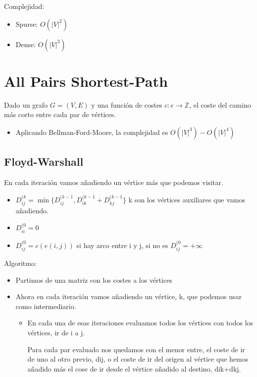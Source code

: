 \documentclass[12pt, twoside, openright]{report} %
\begin{document}
Complejidad:

\begin{itemize}
	\item Spurse: \(O(|V|^2)\)
	\item Dense: \(O(|V|^3)\)
\end{itemize}


\section{All Pairs Shortest-Path}

Dado un grafo \(G=(V,E)\) y una función de costes \(c: e → \mathbb{Z}\),
el coste del camino más corto entre cada par de vértices.

\begin{itemize}
	\item Aplicando Bellman-Ford-Moore, la complejidad es \(O(|V|^3)-O(|V|^4)\)
\end{itemize}

\subsection{Floyd-Warshall}

En cada iteración vamos añadiendo un vértice más que podemos visitar.

\begin{itemize}
	\item $D_{ij}^{(k} = \min \{ D_{ij}^{(k-1}, D_{ik}^{(k-1}+D_{kj}^{(k-1} \}$ k son los vértices auxiliares que vamos añadiendo.
	\item $D_{ii}^{(0} =0$
	\item $D_{ij}^{(0}= c(e(i,j))$ si hay arco entre i y j, si no es $D_{ij}^{(0}= + \infty$
\end{itemize}


Algoritmo:
\begin{itemize}
	\item Partimos de una matriz con los costes a los vértices
	\item Ahora en cada
	      iteración vamos añadiendo un vértice, k, que podemos usar como
	      intermediario.
	      \begin{itemize}
		      \item En cada una de esas iteraciones evaluamos todos los
		            vértices con todos los vértices, ir de i a j.

		            Para cada par evaluado
		            nos quedamos con el menor entre, el coste de ir de uno al otro previo,
		            dij, o el coste de ir del origen al vértice que hemos añadido más el
		            cose de ir desde el vértice añadido al destino, dik+dkj.
	      \end{itemize}

\end{itemize}
\end{document}
